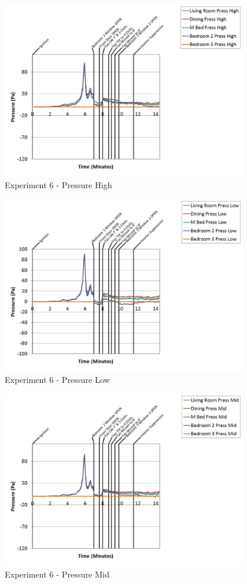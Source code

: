 \documentclass{article}
\begin{document}
\begin{appendices}
	\clearpage

	\begin{figure}[h!]
		\centering
		\includegraphics[height=3.05in]{0_Images/Results_Charts/Exp_6_Charts/PressureHigh.pdf}
		\caption{Experiment 6 - Pressure High}
	\end{figure}
 

	\begin{figure}[h!]
		\centering
		\includegraphics[height=3.05in]{0_Images/Results_Charts/Exp_6_Charts/PressureLow.pdf}
		\caption{Experiment 6 - Pressure Low}
	\end{figure}
 
	\clearpage

	\begin{figure}[h!]
		\centering
		\includegraphics[height=3.05in]{0_Images/Results_Charts/Exp_6_Charts/PressureMid.pdf}
		\caption{Experiment 6 - Pressure Mid}
	\end{figure}
 


\end{appendices}
\end{document}
